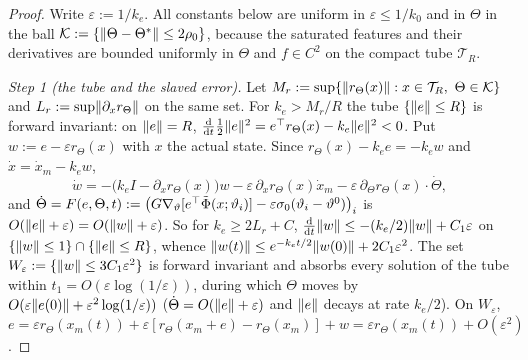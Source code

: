 \begin{proof}
Write $\varepsilon := 1/k_e$. All constants below are uniform in $\varepsilon\le1/k_0$ and in $\Theta$ in the ball
$\mathcal K := \{\lVert \Theta - \Theta^*\rVert \le 2\rho_0\}$, because the saturated features and their derivatives are
bounded uniformly in $\Theta$ and $f\in C^2$ on the compact tube $\mathcal T_R$.

\smallskip
\emph{Step 1 (the tube and the slaved error).} Let
$M_r := \sup\{\lVert r_\Theta(x)\rVert : x\in\mathcal T_R,\ \Theta\in\mathcal K\}$ and $L_r := \sup\lVert \partial_xr_\Theta\rVert$
on the same set. For $k_e > M_r/R$ the tube $\{\lVert e\rVert\le R\}$ is forward invariant: on $\lVert e\rVert = R$,
$\frac{\mathrm{d}}{\mathrm{d}t}\frac12\lVert e\rVert^2 = e^\top r_\Theta(x) - k_e\lVert e\rVert^2 < 0$. Put
$w := e - \varepsilon r_\Theta(x)$ with $x$ the actual state. Since $r_\Theta(x) - k_e e = -k_e w$ and
$\dot x = \dot x_m - k_e w$,
\[
  \dot w = -\bigl(k_eI - \partial_xr_\Theta(x)\bigr)w - \varepsilon\,\partial_xr_\Theta(x)\dot x_m
  - \varepsilon\,\partial_\Theta r_\Theta(x)\cdot\dot\Theta,
\]
and $\dot\Theta = F(e,\Theta,t) := \bigl(G\nabla_\vartheta[e^\top\tilde\Phi(x;\vartheta_i)]
- \varepsilon\sigma_0(\vartheta_i - \vartheta^0)\bigr)_i$ is $O(\lVert e\rVert + \varepsilon) = O(\lVert w\rVert + \varepsilon)$.
So for $k_e\ge2L_r + C$, $\frac{\mathrm{d}}{\mathrm{d}t}\lVert w\rVert \le -(k_e/2)\lVert w\rVert + C_1\varepsilon$ on
$\{\lVert w\rVert\le1\}\cap\{\lVert e\rVert\le R\}$, whence $\lVert w(t)\rVert \le e^{-k_et/2}\lVert w(0)\rVert + 2C_1\varepsilon^2$. The set
$W_\varepsilon := \{\lVert w\rVert \le 3C_1\varepsilon^2\}$ is forward invariant and absorbs every solution of the tube
within $t_1 = O(\varepsilon\log(1/\varepsilon))$, during which $\Theta$ moves by
$O(\varepsilon\lVert e(0)\rVert + \varepsilon^2\log(1/\varepsilon))$ ($\dot\Theta = O(\lVert e\rVert + \varepsilon)$ and $\lVert e\rVert$
decays at rate $k_e/2$). On $W_\varepsilon$,
$e = \varepsilon r_\Theta(x_m(t)) + \varepsilon[r_\Theta(x_m + e) - r_\Theta(x_m)] + w
= \varepsilon r_\Theta(x_m(t)) + O(\varepsilon^2)$.


\end{proof}
